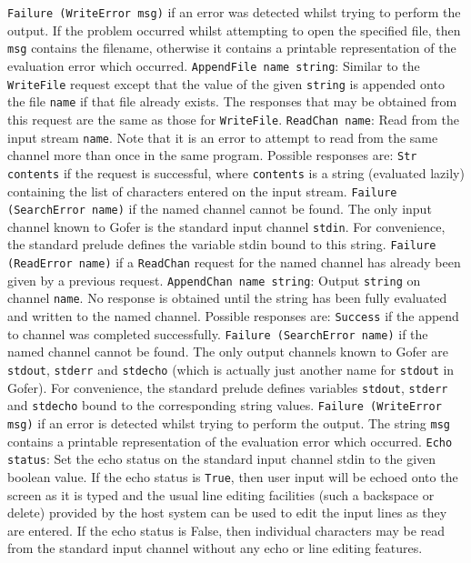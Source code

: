      \IT  \verb"Failure (WriteError msg)" if  an  error  was  detected  whilst
          trying to perform the output.  If the problem occurred whilst
          attempting to open the specified file,  then  \verb"msg"  contains
          the   filename,   otherwise   it   contains    a    printable
          representation of the evaluation error which occurred.
     \EI
\IT  \verb"AppendFile name string":
     Similar to the  \verb"WriteFile" request  except
     that the value of the given \verb"string" is  appended  onto  the  file
     \verb"name" if that file already exists.  The  responses  that  may  be
     obtained from this request are the same as those for \verb"WriteFile".
\IT  \verb"ReadChan name":  Read  from  the  input  stream  \verb"name".  
     Note that
     it is an error to attempt to read from the same channel more  than
     once in the same program.  Possible responses are:
     \BI
     \IT  \verb"Str contents" if the request is successful,  
          where  \verb"contents"
          is  a  string  (evaluated  lazily)  containing  the  list  of
          characters entered on the input stream.
     \IT  \verb"Failure (SearchError name)" if the  named  channel  cannot  be
          found.  The only input channel known to Gofer is the standard
          input channel \verb"stdin".  For convenience, the standard prelude
          defines the variable stdin bound to this string.
     \IT  \verb"Failure (ReadError name)" if a \verb"ReadChan" 
          request for the  named
          channel has already been given by a previous request.
     \EI
\IT  \verb"AppendChan name string":  
     Output \verb"string" on  channel  \verb"name".   No
     response is obtained until the string has been fully evaluated and
     written to the named channel.  Possible responses are:
     \BI
     \IT  \verb"Success" if the append to channel was completed successfully.
     \IT  \verb"Failure (SearchError name)" if the  named  channel  cannot  be
          found.  The only output channels known to Gofer are \verb"stdout",
          \verb"stderr" and \verb"stdecho" 
          (which is actually just  another  name
          for  \verb"stdout"  in  Gofer).   For  convenience,  the  standard
          prelude defines variables \verb"stdout", \verb"stderr" 
          and \verb"stdecho" bound to
          the corresponding string values.
     \IT  \verb"Failure (WriteError msg)"  if  an  error  is  detected  whilst
          trying to perform the output.  The string  \verb"msg"  contains  a
          printable  representation  of  the  evaluation  error   which
          occurred.
     \EI
\IT  \verb"Echo status": Set the echo status on  the  standard  input  channel
     stdin to the given boolean value.  If the  echo  status  is  \verb"True",
     then user input will be echoed onto the screen as it is typed
     and the usual line editing facilities (such a backspace or delete)
     provided by the host system can be used to edit the input lines as
     they are entered.  If the echo status is  False,  then  individual
     characters may be read from the standard input channel without any
     echo or line editing features.

